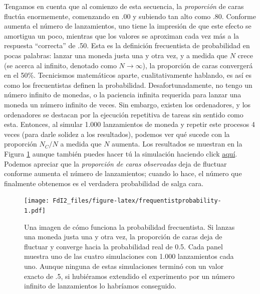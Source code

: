 \documentclass[spanish,]{book}
\begin{document}
Tengamos en cuenta que al comienzo de esta secuencia, la
\emph{proporción} de caras fluctúa enormemente, comenzando en .00 y
subiendo tan alto como .80. Conforme aumenta el número de lanzamientos,
uno tiene la impresión de que este efecto se amortigua un poco, mientras
que los valores se aproximan cada vez más a la respuesta ``correcta'' de
.50. Esta es la definición frecuentista de probabilidad en pocas
palabras: lanzar una moneda justa una y otra vez, y a medida que \(N\)
crece (se acerca al infinito, denotado como \(N\rightarrow \infty\)), la
proporción de caras convergerá en el 50\%. Tecnicismos matemáticos
aparte, cualitativamente hablando, es así es como los frecuentistas
definen la probabilidad. Desafortunadamente, no tengo un número infinito
de monedas, o la paciencia infinita requerida para lanzar una moneda un
número infinito de veces. Sin embargo, existen los ordenadores, y los
ordenadores se destacan por la ejecución repetitiva de tareas sin
sentido como esta. Entonces, al simular 1.000 lanzamientos de moneda y
repetir este procesos 4 veces (para darle solidez a los resultados),
podemos ver qué sucede con la proporción \(N_C / N\) a medida que \(N\)
aumenta. Los resultados se muestran en la Figura
\ref{fig:frequentistprobability} aunque también puedes hacer tú la
simulación haciendo click
\href{https://leudave.shinyapps.io/cara_cruz/}{aquí}. Podemos apreciar
que la \emph{proporción de caras observadas} deja de fluctuar conforme
aumenta el número de lanzamientos; cuando lo hace, el número que
finalmente obtenemos es el verdadera probabilidad de salga cara.

\begin{figure}
\centering
\texttt{[image: FdI2\_files/figure-latex/frequentistprobability-1.pdf]}
\caption{\label{fig:frequentistprobability} Una imagen de cómo funciona la
probabilidad frecuentista. Si lanzas una moneda justa una y otra vez, la
proporción de caras deja de fluctuar y converge hacia la probabilidad
real de 0.5. Cada panel muestra uno de las cuatro simulaciones con 1.000
lanzamientos cada uno. Aunque ninguna de estas simulaciones terminó con
un valor exacto de .5, si hubiéramos extendido el experimento por un
número infinito de lanzamientos lo habríamos conseguido.}
\end{figure}
\end{document}
